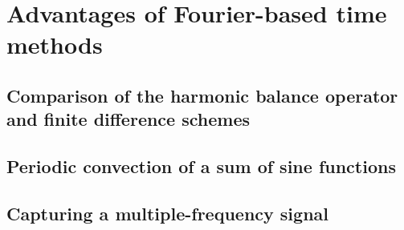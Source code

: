 \chapter{Advantages of Fourier-based time methods}
\label{cha:advantages}

\chabstract{}

\minitoc
\newpage


\section{Comparison of the harmonic balance operator and finite difference schemes}
\label{sec:hb_operator}


\section{Periodic convection of a sum of sine functions}
\label{sec:sum_sine}


\section{Capturing a multiple-frequency signal}
\label{sec:adv_multifreq}


\chconclu{}
